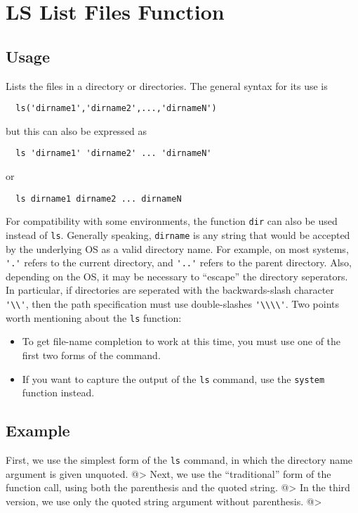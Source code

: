 \section{LS List Files Function}

\subsection{Usage}

Lists the files in a directory or directories.  The general syntax for its use is
\begin{verbatim}
  ls('dirname1','dirname2',...,'dirnameN')
\end{verbatim}
but this can also be expressed as
\begin{verbatim}
  ls 'dirname1' 'dirname2' ... 'dirnameN'
\end{verbatim}
or 
\begin{verbatim}
  ls dirname1 dirname2 ... dirnameN
\end{verbatim}
For compatibility with some environments, the function \verb|dir| can also be used instead of \verb|ls|.  Generally speaking, \verb|dirname| is any string that would be accepted by the underlying OS as a valid directory name.  For example, on most systems, \verb|'.'| refers to the current directory, and \verb|'..'| refers to the parent directory.  Also, depending on the OS, it may be necessary to ``escape'' the directory seperators.  In particular, if directories are seperated with the backwards-slash character \verb|'\\'|, then the path specification must use double-slashes \verb|'\\\\'|. Two points worth mentioning about the \verb|ls| function:
\begin{itemize}
\item  To get file-name completion to work at this time, you must use one of the first two forms of the command.

\item  If you want to capture the output of the \verb|ls| command, use the \verb|system| function instead.

\end{itemize}

\subsection{Example}

First, we use the simplest form of the \verb|ls| command, in which the directory name argument is given unquoted.
@>
Next, we use the ``traditional'' form of the function call, using both the parenthesis and the quoted string.
@>
In the third version, we use only the quoted string argument without parenthesis.  
@>
